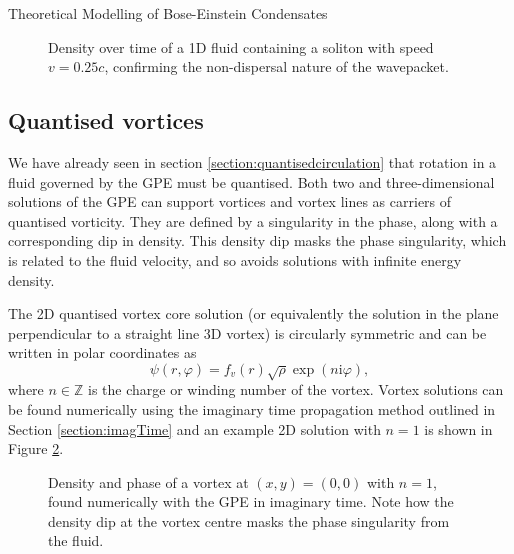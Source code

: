 \begin{chapter}{\label{cha:theoretical_model}Theoretical Modelling of Bose-Einstein Condensates}
\begin{figure}
  \caption{Density over time of a 1D fluid containing a soliton with speed $v=0.25c$, confirming the non-dispersal nature of the wavepacket.}\label{fig_solitonmove}
 \end{figure}


\subsection{\label{section:vortices} Quantised vortices}
We have already seen in section \ref{section:quantisedcirculation} that rotation in a fluid governed by the GPE must be quantised. Both two and three-dimensional solutions of the GPE can support vortices and vortex lines as carriers of quantised vorticity. They are defined by a singularity in the phase, along with a corresponding dip in density. This density dip masks the phase singularity, which is related to the fluid velocity, and so avoids solutions with infinite energy density.

The 2D quantised vortex core solution (or equivalently the solution in the plane perpendicular to a straight line 3D vortex) is circularly symmetric and can be written in polar coordinates as
	\begin{equation}\label{eq_vortexsol}
	\psi(r,\varphi) = f_v(r)\sqrt{\rho}\exp(n\mathrm{i}\varphi),
	\end{equation}
where $n\in\mathbb{Z}$ is the charge or winding number of the vortex. Vortex solutions can be found numerically using the imaginary time propagation method outlined in Section \ref{section:imagTime} and an example 2D solution with $n=1$ is shown in Figure \ref{fig_vortexdensphase}.

\begin{figure}
	\centering
  \caption{Density and phase of a vortex at $(x,y) = (0,0)$ with $n=1$, found numerically with the GPE in imaginary time. Note how the density dip at the vortex centre masks the phase singularity from the fluid. }\label{fig_vortexdensphase}
 \end{figure}


\end{chapter}
